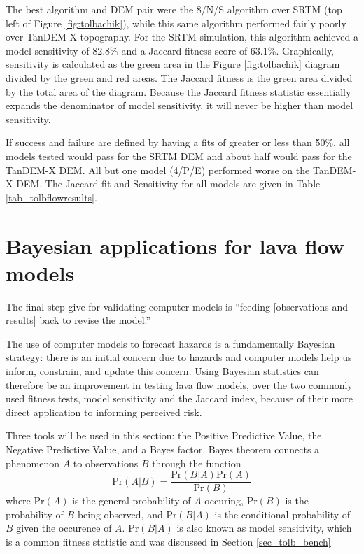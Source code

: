			The best algorithm and DEM pair were the 8/N/S algorithm over SRTM (top left of Figure \ref{fig:tolbachik}), while this same algorithm performed fairly poorly over TanDEM-X topography. For the SRTM simulation, this algorithm achieved a model sensitivity of 82.8\% and a Jaccard fitness score of 63.1\%. Graphically, sensitivity is calculated as the green area in the Figure \ref{fig:tolbachik} diagram divided by the green and red areas. The Jaccard fitness is the green area divided by the total area of the diagram. Because the Jaccard fitness statistic essentially expands the denominator of model sensitivity, it will never be higher than model sensitivity.
			
			If success and failure are defined by having a fits of greater or less than 50\%, all models tested would pass for the SRTM DEM and about half would pass for the TanDEM-X DEM. All but one model (4/P/E) performed worse on the TanDEM-X DEM. The Jaccard fit and Sensitivity for all models are given in Table \ref{tab_tolbflowresults}.
					


\section{Bayesian applications for lava flow models}\label{sec:Bayesian}
	The final step \citet{bayarri2007framework} give for validating computer models is ``feeding [observations and results] back to revise the model.''
	
	The use of computer models to forecast hazards is a fundamentally Bayesian strategy: there is an initial concern due to hazards and computer models help us inform, constrain, and update this concern. Using Bayesian statistics can therefore be an improvement in testing lava flow models, over the two commonly used fitness tests, model sensitivity and the Jaccard index, because of their more direct application to informing perceived risk. 
	
	Three tools will be used in this section: the Positive Predictive Value, the Negative Predictive Value, and a Bayes factor. Bayes theorem connects a phenomenon $A$ to observations $B$ through the function
	\begin{equation}
		\text{Pr}(A|B)=\frac{\text{Pr}(B|A)\text{Pr}(A)}{\text{Pr}(B)}\label{eq_bayes}
	\end{equation}
	where $\text{Pr}(A)$ is the general probability of $A$ occuring, $\text{Pr}(B)$ is the probability of $B$ being observed, and $\text{Pr}(B|A)$ is the conditional probability of $B$ given the occurence of $A$. $\text{Pr}(B|A)$ is also known as model sensitivity, which is a common fitness statistic and was discussed in Section \ref{sec_tolb_bench}
	
